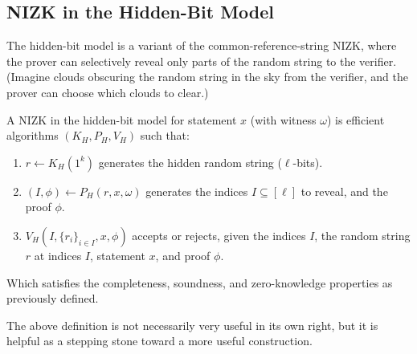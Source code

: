 \subsection{NIZK in the Hidden-Bit Model}
The hidden-bit model is a variant of the common-reference-string NIZK,
where the prover can selectively reveal only parts of the random string to the
verifier. (Imagine clouds obscuring the random string in the sky from the
verifier, and the prover can choose which clouds to clear.)

\newcommand{\setI}[1]{\{#1\}_{i \in I}}
\begin{definition}
    A NIZK in the hidden-bit model for statement $x$ (with witness $\omega$)
    is efficient algorithms $(K_H, P_H, V_H)$
    such that:
\begin{enumerate}
    \item $r \gets K_H(1^k)$ generates the hidden random string ($\ell$-bits).
    \item $(I, \phi) \gets P_H(r, x, \omega)$ generates the indices $I \subseteq
        [\ell]$ to reveal, and the proof $\phi$.
    \item $V_H(I, \setI{r_i}, x, \phi)$ accepts or rejects, given the indices $I$,
        the random string $r$ at indices $I$, statement $x$, and proof $\phi$.
\end{enumerate}
Which satisfies the completeness, soundness, and zero-knowledge properties as
previously defined.
\end{definition}

The above definition is not necessarily very useful in its own right, but it is helpful as a stepping stone toward a more useful construction.

